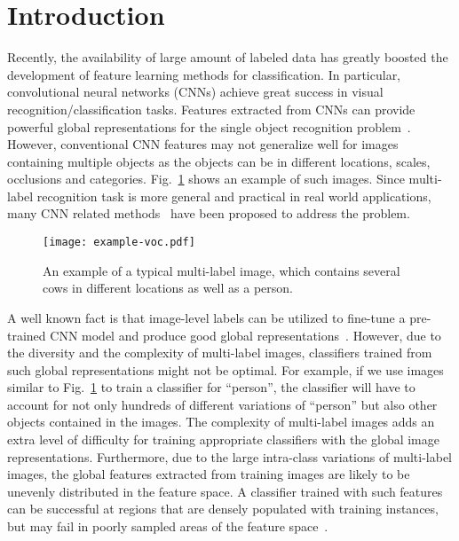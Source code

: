 \documentclass[10pt,twocolumn,letterpaper]{article}
\begin{document}
\section{Introduction} \label{intro}
Recently, the availability of large amount of labeled data has
greatly boosted the development of feature learning methods for
classification. In particular, convolutional neural networks (CNNs)
achieve great success in visual recognition/classification tasks.
Features extracted from CNNs can provide powerful global
representations for the single object recognition
problem~\cite{Alex2012,Sermanet2013,Razavian2014}. However,
conventional CNN features may not generalize well for images
containing multiple objects as the objects can be in different
locations, scales, occlusions and categories. Fig.~\ref{example-voc} shows an
example of such images. Since multi-label recognition task is more
general and practical in real world applications, many CNN related
methods~\cite{OquabCVPR2014,Oquab2014,Wei2014} have been proposed
to address the problem.

\begin{figure}
 \centering
 \texttt{[image: example-voc.pdf]}
 \caption{An example of a typical multi-label image, which contains several cows in different locations as well as a person.}
 \label{example-voc}
\end{figure}

A well known fact is that image-level labels can be utilized to
fine-tune a pre-trained CNN model and produce good global
representations~\cite{Sermanet2013,Razavian2014,Oquab2014}.
However, due to the diversity and the complexity of multi-label
images, classifiers trained from such global representations might
not be optimal. For example, if we use images similar to
Fig.~\ref{example-voc} to train a classifier for ``person'', the
classifier will have to account for not only hundreds of
different variations of ``person'' but also other objects contained in the images. The complexity of
multi-label images adds an extra level of difficulty for training
appropriate classifiers with the global image representations.
Furthermore, due to the large intra-class variations of
multi-label images, the global features extracted from training
images are likely to be unevenly distributed in the feature space.
A classifier trained with such features can be successful at
regions that are densely populated with
training instances, but may fail in poorly sampled areas of the
feature space~\cite{Yu2014}.
\end{document}
